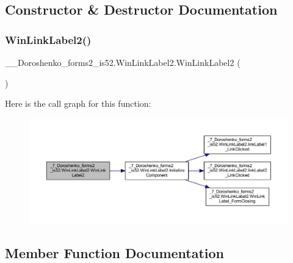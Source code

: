\subsection{Constructor \& Destructor Documentation}
\hypertarget{class__7___doroshenko__forms2__is52_1_1_win_link_label2_ae5b9767da47dfc2718254a3a92b10ce8}{}\label{class__7___doroshenko__forms2__is52_1_1_win_link_label2_ae5b9767da47dfc2718254a3a92b10ce8} 
\subsubsection{\texorpdfstring{Win\+Link\+Label2()}{WinLinkLabel2()}}
{\footnotesize\ttfamily \+\_\+\_\+\+Doroshenko\+\_\+forms2\+\_\+is52.\+Win\+Link\+Label2.\+Win\+Link\+Label2 (\begin{DoxyParamCaption}{ }\end{DoxyParamCaption})}

Here is the call graph for this function\+:
\nopagebreak
\begin{figure}[H]
\begin{center}
\leavevmode
\includegraphics[width=350pt]{class__7___doroshenko__forms2__is52_1_1_win_link_label2_ae5b9767da47dfc2718254a3a92b10ce8_cgraph}
\end{center}
\end{figure}


\subsection{Member Function Documentation}
\hypertarget{class__7___doroshenko__forms2__is52_1_1_win_link_label2_a2eb3b8d18cbe816ea81850eab14cf911}{}\label{class__7___doroshenko__forms2__is52_1_1_win_link_label2_a2eb3b8d18cbe816ea81850eab14cf911} 
